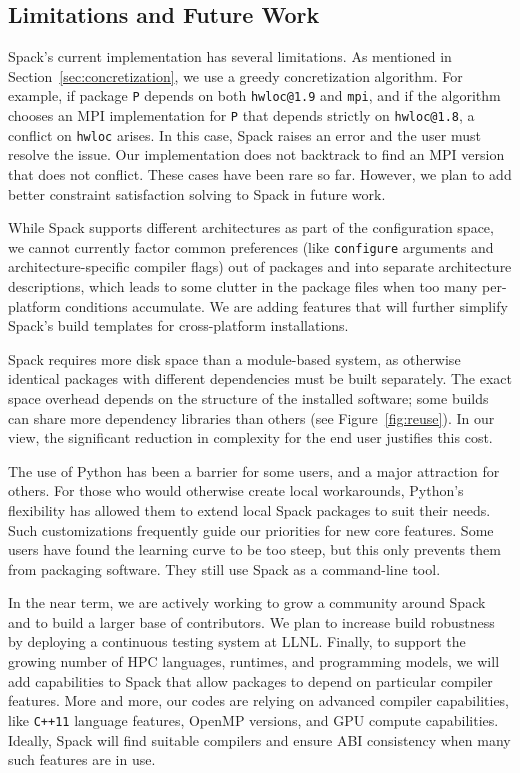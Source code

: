 
\subsection{Limitations and Future Work}

Spack's current implementation has several limitations.
As mentioned in Section~\ref{sec:concretization}, we use a greedy 
concretization algorithm. For example, if package {\tt P} depends on 
both {\tt hwloc@1.9} and {\tt mpi}, and if the algorithm
chooses an MPI implementation for {\tt P} that depends strictly on
{\tt hwloc@1.8}, a conflict on {\tt hwloc} arises. In this case, Spack 
raises an error and the user must resolve the issue. Our implementation 
does not backtrack to find an MPI version that does not conflict. These 
cases have been rare so far. However, we plan to add better constraint
satisfaction solving to Spack in future work.

While Spack supports different architectures as part of the 
configuration space, we cannot currently factor common preferences (like 
{\tt configure} arguments and architecture-specific compiler flags) out of 
packages and into separate architecture descriptions, which leads to some 
clutter in the package files when too many per-platform conditions accumulate.
We are adding features that will further simplify Spack's build templates
for cross-platform installations.

Spack requires more disk space than a module-based system, as otherwise 
identical packages with different dependencies must be built separately. 
The exact space overhead depends on the structure of the installed
software; some builds can share more dependency libraries than others
(see Figure~\ref{fig:reuse}).
In our view, the significant reduction in complexity for the end user
justifies this cost.

The use of Python has been a barrier for some users, and
a major attraction for others. For those who would otherwise create local
workarounds, Python's flexibility has allowed them to extend local
Spack packages to suit their needs. Such customizations frequently
guide our priorities for new core features. Some users have found the 
learning curve to be too steep, but this only prevents them from 
packaging software. They still use Spack as a command-line tool.

In the near term, we are actively working to grow a community around Spack 
and to build a larger base of contributors. We plan to
increase build robustness by deploying a continuous testing system
at LLNL.  Finally, to support the growing number of
HPC languages, runtimes, and programming models, we will add
capabilities to Spack that allow packages to depend on particular
compiler features.  More and more, our codes are relying
on advanced compiler capabilities, like {\tt C++11} language features,
OpenMP versions, and GPU compute capabilities. Ideally, Spack
will find suitable compilers and ensure ABI consistency when many
such features are in use.
